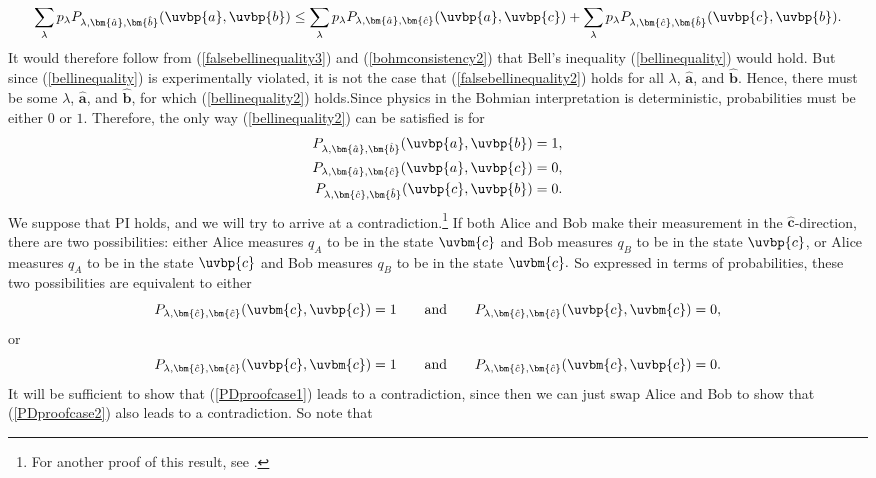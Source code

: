 \documentclass[12pt]{report}
\begin{document}
{\begin{equation}
\sum_\lambda p_{\lambda}P_{\lambda,\bm{\hat{a}},\bm{\hat{b}}}(\uvbp{a},\uvbp{b})\leq \sum_\lambda p_{\lambda}P_{\lambda,\bm{\hat{a}},\bm{\hat{c}}}(\uvbp{a},\uvbp{c})+\sum_\lambda p_{\lambda} P_{\lambda,\bm{\hat{c}},\bm{\hat{b}}}(\uvbp{c},\uvbp{b}).
\end{equation} 
It would therefore follow from (\ref{falsebellinequality3}) and  (\ref{bohmconsistency2}) that Bell's inequality (\ref{bellinequality}) would hold. But since (\ref{bellinequality}) is experimentally violated, it is not the case that (\ref{falsebellinequality2}) holds for all $\lambda$, $\bm{\hat{a}}$, and $\bm{\hat{b}}$. Hence, there must be some $\lambda$, $\bm{\hat{a}}$, and $\bm{\hat{b}}$,  for which (\ref{bellinequality2}) holds.}Since physics in the Bohmian interpretation is deterministic, probabilities must be either $0$ or $1$. Therefore, the only way (\ref{bellinequality2}) can be satisfied is for
 \begin{align}
P_{\lambda,\bm{\hat{a}},\bm{\hat{b}}}(\uvbp{a},\uvbp{b})&=1, \label{PDproof1}\\
P_{\lambda,\bm{\hat{a}},\bm{\hat{c}}}(\uvbp{a},\uvbp{c})&=0,\label{PDproof2}\\
P_{\lambda,\bm{\hat{c}},\bm{\hat{b}}}(\uvbp{c},\uvbp{b})&=0. \label{PDproof3}
 \end{align}
 We suppose that PI holds, and we will try to arrive at a contradiction.\footnote{For another proof of this result, see \cite{BellJ.S.1964OtEP}.} If both Alice and Bob make their measurement in the $\bm{\hat{c}}$-direction, there are two possibilities: either Alice measures $q_A$ to be in the state $\uvbm{c}$ and Bob measures $q_B$ to be in the state $\uvbp{c}$, or Alice measures $q_A$ to be in the state $\uvbp{c}$ and Bob measures $q_B$ to be in the state $\uvbm{c}.$ So expressed in terms of probabilities, these two possibilities are equivalent to either 
 \begin{equation}\label{PDproofcase1}
 P_{\lambda,\bm{\hat{c}},\bm{\hat{c}}}(\uvbm{c},\uvbp{c})=1 \qquad\text{and}\qquad  P_{\lambda,\bm{\hat{c}},\bm{\hat{c}}}(\uvbp{c},\uvbm{c})=0,
 \end{equation}
 or 
  \begin{equation}\label{PDproofcase2}
 P_{\lambda,\bm{\hat{c}},\bm{\hat{c}}}(\uvbp{c},\uvbm{c})=1 \qquad\text{and}\qquad P_{\lambda,\bm{\hat{c}},\bm{\hat{c}}}(\uvbm{c},\uvbp{c})=0.
 \end{equation}
 It will be sufficient to show that (\ref{PDproofcase1}) leads to a contradiction, since then we can just swap Alice and Bob to show that (\ref{PDproofcase2}) also leads to a contradiction. So note that
\end{document}
